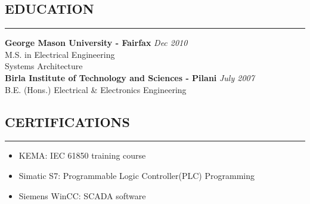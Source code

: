 \documentclass{article}
\begin{document}
%
\subsection*{\MakeUppercase{\bf Education}}
    \hrule
    \bigskip
    {\bf George Mason University - Fairfax} \hfill {\em Dec 2010} \\ 
    M.S. in Electrical Engineering \\
    Systems Architecture \bigskip \\

    {\bf Birla Institute of Technology and Sciences - Pilani}
    \hfill {\em July 2007} \\ 
    B.E. (Hons.) Electrical \& Electronics Engineering \bigskip \\

%
\subsection*{\MakeUppercase{\bf Certifications}}
    \hrule
    \bigskip
    \begin{itemize}
    \item KEMA: IEC 61850 training course
    \item Simatic S7: Programmable Logic Controller(PLC) Programming
    \item Siemens WinCC: SCADA software
    \end{itemize}
    \bigskip
\end{document}
